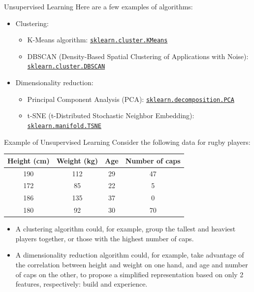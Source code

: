 \begin{frame}{Unsupervised Learning}
	Here are a few examples of algorithms:
	
	\begin{itemize}
		\item Clustering:
		\begin{itemize}
			\item K-Means algorithm: \href{https://scikit-learn.org/stable/modules/generated/sklearn.cluster.KMeans.html}{\texttt{sklearn.cluster.KMeans}}
			\item DBSCAN (Density-Based Spatial Clustering of Applications with Noise): \href{https://scikit-learn.org/stable/modules/generated/sklearn.cluster.DBSCAN.html}{\texttt{sklearn.cluster.DBSCAN}}
		\end{itemize}
		\item Dimensionality reduction:
		\begin{itemize}
			\item Principal Component Analysis (PCA): \href{https://scikit-learn.org/stable/modules/generated/sklearn.decomposition.PCA.html}{\texttt{sklearn.decomposition.PCA}}
			\item t-SNE (t-Distributed Stochastic Neighbor Embedding): \href{https://scikit-learn.org/stable/modules/generated/sklearn.manifold.TSNE.html}{\texttt{sklearn.manifold.TSNE}}
		\end{itemize}
	\end{itemize}
\end{frame}

\begin{frame}{Example of Unsupervised Learning}
	Consider the following data for rugby players:
	\begin{table}
		\centering
		\begin{tabular}{|c|c|c|c|}
			\hline
			\textbf{Height} (cm) & \textbf{Weight} (kg) & \textbf{Age} & \textbf{Number of caps} \\ \hline
			190              & 112            & 29           & 47 \\
			172              & 85             & 22           & 5  \\
			186              & 135            & 37           & 0  \\
			180              & 92             & 30           & 70 \\
			\hline
		\end{tabular}
	\end{table}
	\begin{itemize}
		\item A clustering algorithm could, for example, group the tallest and heaviest players together, or those with the highest number of caps.
		\item A dimensionality reduction algorithm could, for example, take advantage of the correlation between height and weight on one hand, and age and number of caps on the other, to propose a simplified representation based on only 2 features, respectively: build and experience.
	\end{itemize}
\end{frame}


